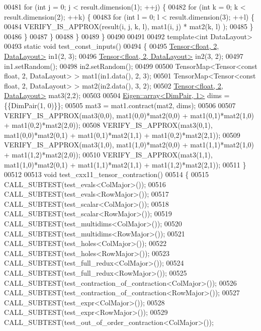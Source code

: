 \begin{DoxyCode}
00481     \textcolor{keywordflow}{for} (\textcolor{keywordtype}{int} j = 0; j < result.dimension(1); ++j) \{
00482       \textcolor{keywordflow}{for} (\textcolor{keywordtype}{int} k = 0; k < result.dimension(2); ++k) \{
00483         \textcolor{keywordflow}{for} (\textcolor{keywordtype}{int} l = 0; l < result.dimension(3); ++l) \{
00484             VERIFY\_IS\_APPROX(result(i, j, k, l), mat1(i, j) * mat2(k, l) );
00485         \}
00486       \}
00487     \}
00488   \}
00489 \}
00490 
00491 
00492 \textcolor{keyword}{template}<\textcolor{keywordtype}{int} DataLayout>
00493 \textcolor{keyword}{static} \textcolor{keywordtype}{void} test\_const\_inputs()
00494 \{
00495   \hyperlink{class_eigen_1_1_tensor}{Tensor<float, 2, DataLayout>} in1(2, 3);
00496   \hyperlink{class_eigen_1_1_tensor}{Tensor<float, 2, DataLayout>} in2(3, 2);
00497   in1.setRandom();
00498   in2.setRandom();
00499 
00500   TensorMap<Tensor<const float, 2, DataLayout> > mat1(in1.data(), 2, 3);
00501   TensorMap<Tensor<const float, 2, DataLayout> > mat2(in2.data(), 3, 2);
00502   \hyperlink{class_eigen_1_1_tensor}{Tensor<float, 2, DataLayout>} mat3(2,2);
00503 
00504   \hyperlink{class_eigen_1_1array}{Eigen::array<DimPair, 1>} dims = \{\{DimPair(1, 0)\}\};
00505   mat3 = mat1.contract(mat2, dims);
00506 
00507   VERIFY\_IS\_APPROX(mat3(0,0), mat1(0,0)*mat2(0,0) + mat1(0,1)*mat2(1,0) + mat1(0,2)*mat2(2,0));
00508   VERIFY\_IS\_APPROX(mat3(0,1), mat1(0,0)*mat2(0,1) + mat1(0,1)*mat2(1,1) + mat1(0,2)*mat2(2,1));
00509   VERIFY\_IS\_APPROX(mat3(1,0), mat1(1,0)*mat2(0,0) + mat1(1,1)*mat2(1,0) + mat1(1,2)*mat2(2,0));
00510   VERIFY\_IS\_APPROX(mat3(1,1), mat1(1,0)*mat2(0,1) + mat1(1,1)*mat2(1,1) + mat1(1,2)*mat2(2,1));
00511 \}
00512 
00513 \textcolor{keywordtype}{void} test\_cxx11\_tensor\_contraction()
00514 \{
00515   CALL\_SUBTEST(test\_evals<ColMajor>());
00516   CALL\_SUBTEST(test\_evals<RowMajor>());
00517   CALL\_SUBTEST(test\_scalar<ColMajor>());
00518   CALL\_SUBTEST(test\_scalar<RowMajor>());
00519   CALL\_SUBTEST(test\_multidims<ColMajor>());
00520   CALL\_SUBTEST(test\_multidims<RowMajor>());
00521   CALL\_SUBTEST(test\_holes<ColMajor>());
00522   CALL\_SUBTEST(test\_holes<RowMajor>());
00523   CALL\_SUBTEST(test\_full\_redux<ColMajor>());
00524   CALL\_SUBTEST(test\_full\_redux<RowMajor>());
00525   CALL\_SUBTEST(test\_contraction\_of\_contraction<ColMajor>());
00526   CALL\_SUBTEST(test\_contraction\_of\_contraction<RowMajor>());
00527   CALL\_SUBTEST(test\_expr<ColMajor>());
00528   CALL\_SUBTEST(test\_expr<RowMajor>());
00529   CALL\_SUBTEST(test\_out\_of\_order\_contraction<ColMajor>());

\end{DoxyCode}
